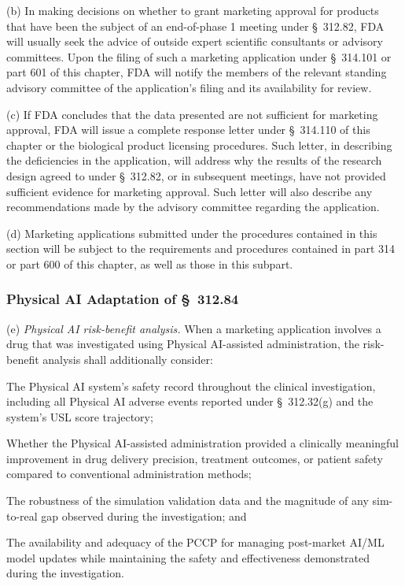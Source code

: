 (b) In making decisions on whether to grant marketing approval for products that have been the subject of an end-of-phase 1 meeting under \S~312.82, FDA will usually seek the advice of outside expert scientific consultants or advisory committees. Upon the filing of such a marketing application under \S~314.101 or part 601 of this chapter, FDA will notify the members of the relevant standing advisory committee of the application's filing and its availability for review.

(c) If FDA concludes that the data presented are not sufficient for marketing approval, FDA will issue a complete response letter under \S~314.110 of this chapter or the biological product licensing procedures. Such letter, in describing the deficiencies in the application, will address why the results of the research design agreed to under \S~312.82, or in subsequent meetings, have not provided sufficient evidence for marketing approval. Such letter will also describe any recommendations made by the advisory committee regarding the application.

(d) Marketing applications submitted under the procedures contained in this section will be subject to the requirements and procedures contained in part 314 or part 600 of this chapter, as well as those in this subpart.

\subsubsection{Physical AI Adaptation of \S~312.84}

(e) \textit{Physical AI risk-benefit analysis.} When a marketing application involves a drug that was investigated using Physical AI-assisted administration, the risk-benefit analysis shall additionally consider:

\begin{description}[leftmargin=0.8cm,style=sameline]
\item[(i)] The Physical AI system's safety record throughout the clinical investigation, including all Physical AI adverse events reported under \S~312.32(g) and the system's USL score trajectory;
\item[(ii)] Whether the Physical AI-assisted administration provided a clinically meaningful improvement in drug delivery precision, treatment outcomes, or patient safety compared to conventional administration methods;
\item[(iii)] The robustness of the simulation validation data and the magnitude of any sim-to-real gap observed during the investigation; and
\item[(iv)] The availability and adequacy of the PCCP for managing post-market AI/ML model updates while maintaining the safety and effectiveness demonstrated during the investigation.
\end{description}

